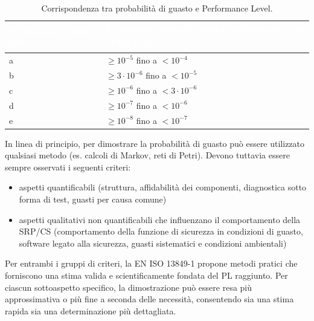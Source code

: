\begin{table}[ht]
    \centering
    \setlength{\tabcolsep}{4pt}
    \renewcommand{\arraystretch}{1.2}
    \caption{Corrispondenza tra probabilità di guasto e Performance Level.}
    \label{tab:06-1}
    \begin{tabularx}{\textwidth}{|>{\raggedright\arraybackslash}p{4.8cm}|>{\centering\arraybackslash}X|}
        \hline
        \rowcolor{tabblue}
        \textcolor{white}{\textbf{Performance Level (PL)}} &
        \textcolor{white}{\textbf{Probabilità media di guasto pericoloso per ora (\textit{PFH}\textsubscript{D}) in h\textsuperscript{-1}}} \\
        \hline
        a & $\geq 10^{-5}$ fino a $< 10^{-4}$ \\
        \hline
        \rowcolor{black!8}
        b & $\geq 3 \cdot 10^{-6}$ fino a $< 10^{-5}$ \\
        \hline
        c & $\geq 10^{-6}$ fino a $< 3 \cdot 10^{-6}$ \\
        \hline
        \rowcolor{black!8}
        d & $\geq 10^{-7}$ fino a $< 10^{-6}$ \\
        \hline
        e & $\geq 10^{-8}$ fino a $< 10^{-7}$ \\
        \hline
    \end{tabularx}
\end{table}

In linea di principio, per dimostrare la probabilità di guasto può essere utilizzato qualsiasi metodo (es. calcoli di Markov, reti di Petri). Devono tuttavia essere sempre osservati i seguenti criteri:
	
\begin{itemize}
    \item aspetti quantificabili (struttura, affidabilità dei componenti, diagnostica sotto forma di test, guasti per causa comune)
    \item aspetti qualitativi non quantificabili che influenzano il comportamento della SRP/CS (comportamento della funzione di sicurezza in condizioni di guasto, software legato alla sicurezza, guasti sistematici e condizioni ambientali)
\end{itemize}

Per entrambi i gruppi di criteri, la EN ISO 13849-1 propone metodi pratici che forniscono una stima valida e scientificamente fondata del PL raggiunto. Per ciascun sottoaspetto specifico, la dimostrazione può essere resa più approssimativa o più fine a seconda delle necessità, consentendo sia una stima rapida sia una determinazione più dettagliata.

